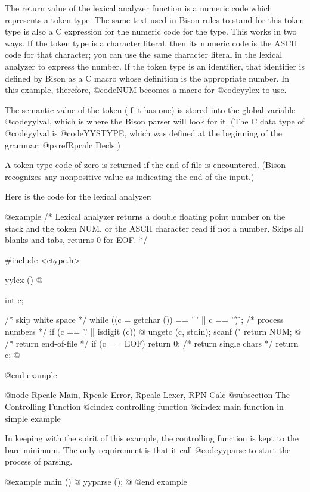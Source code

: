 {{{The return value of the lexical analyzer function is a numeric code which
represents a token type.  The same text used in Bison rules to stand for
this token type is also a C expression for the numeric code for the type.
This works in two ways.  If the token type is a character literal, then its
numeric code is the ASCII code for that character; you can use the same
character literal in the lexical analyzer to express the number.  If the
token type is an identifier, that identifier is defined by Bison as a C
macro whose definition is the appropriate number.  In this example,
therefore, @code{NUM} becomes a macro for @code{yylex} to use.

The semantic value of the token (if it has one) is stored into the global
variable @code{yylval}, which is where the Bison parser will look for it.
(The C data type of @code{yylval} is @code{YYSTYPE}, which was defined
at the beginning of the grammar; @pxref{Rpcalc Decls}.)

A token type code of zero is returned if the end-of-file is encountered.
(Bison recognizes any nonpositive value as indicating the end of the
input.)

Here is the code for the lexical analyzer:

@example
/* Lexical analyzer returns a double floating point 
   number on the stack and the token NUM, or the ASCII
   character read if not a number.  Skips all blanks
   and tabs, returns 0 for EOF. */

#include <ctype.h>

yylex ()
@{
  int c;

  /* skip white space  */
  while ((c = getchar ()) == ' ' || c == '\t')  
    ;
  /* process numbers   */
  if (c == '.' || isdigit (c))                
    @{
      ungetc (c, stdin);
      scanf ("%
      return NUM;
    @}
  /* return end-of-file  */
  if (c == EOF)                            
    return 0;
  /* return single chars */
  return c;                                
@}
@end example

@node Rpcalc Main, Rpcalc Error, Rpcalc Lexer, RPN Calc
@subsection The Controlling Function
@cindex controlling function
@cindex main function in simple example

In keeping with the spirit of this example, the controlling function is
kept to the bare minimum.  The only requirement is that it call
@code{yyparse} to start the process of parsing.

@example
main ()
@{
  yyparse ();
@}
@end example

}}}
